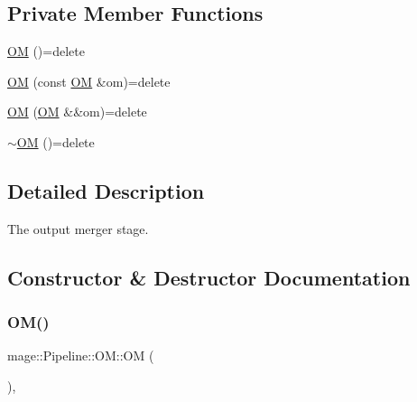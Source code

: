 \subsection*{Private Member Functions}
\begin{DoxyCompactItemize}
\item 
\hyperlink{structmage_1_1_pipeline_1_1_o_m_a45cd7cd5268a8a3d321e7f0a0ca74a3e}{OM} ()=delete
\item 
\hyperlink{structmage_1_1_pipeline_1_1_o_m_a914d4c2d50a4b4f1024ff9eff66c93f9}{OM} (const \hyperlink{structmage_1_1_pipeline_1_1_o_m}{OM} \&om)=delete
\item 
\hyperlink{structmage_1_1_pipeline_1_1_o_m_a49fa0cafd43514615ce03d66e631df72}{OM} (\hyperlink{structmage_1_1_pipeline_1_1_o_m}{OM} \&\&om)=delete
\item 
\hyperlink{structmage_1_1_pipeline_1_1_o_m_a3208c6e481655c2f8119105c4de1703b}{$\sim$\+OM} ()=delete
\end{DoxyCompactItemize}


\subsection{Detailed Description}
The output merger stage. 

\subsection{Constructor \& Destructor Documentation}
\hypertarget{structmage_1_1_pipeline_1_1_o_m_a45cd7cd5268a8a3d321e7f0a0ca74a3e}{}\label{structmage_1_1_pipeline_1_1_o_m_a45cd7cd5268a8a3d321e7f0a0ca74a3e} 
\subsubsection{\texorpdfstring{O\+M()}{OM()}\hspace{0.1cm}{\footnotesize\ttfamily [1/3]}}
{\footnotesize\ttfamily mage\+::\+Pipeline\+::\+O\+M\+::\+OM (\begin{DoxyParamCaption}{ }\end{DoxyParamCaption})\hspace{0.3cm}{\ttfamily [private]}, {\ttfamily [delete]}}

\hypertarget{structmage_1_1_pipeline_1_1_o_m_a914d4c2d50a4b4f1024ff9eff66c93f9}{}\label{structmage_1_1_pipeline_1_1_o_m_a914d4c2d50a4b4f1024ff9eff66c93f9} 
